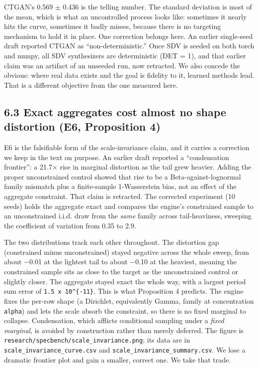 CTGAN's 0.569 \ensuremath{\pm} 0.436 is the telling number. The standard
deviation is most of the mean, which is what an uncontrolled process
looks like: sometimes it nearly hits the curve, sometimes it badly
misses, because there is no targeting mechanism to hold it in place. One
correction belongs here. An earlier single-seed draft reported CTGAN as
``non-deterministic.'' Once SDV is seeded on both torch and numpy, all
SDV synthesizers are deterministic (DET = 1), and that earlier claim was
an artifact of an unseeded run, now retracted. We also concede the
obvious: where real data exists and the goal is fidelity to it, learned
methods lead. That is a different objective from the one measured here.

\hypertarget{exact-aggregates-cost-almost-no-shape-distortion-e6-proposition-4}{%
\subsection{6.3 Exact aggregates cost almost no shape distortion (E6,
Proposition
4)}\label{exact-aggregates-cost-almost-no-shape-distortion-e6-proposition-4}}

E6 is the falsifiable form of the scale-invariance claim, and it carries
a correction we keep in the text on purpose. An earlier draft reported a
``condensation frontier'': a 21.7\ensuremath{\times} rise in marginal
distortion as the tail grew heavier. Adding the proper unconstrained
control showed that rise to be a Beta-against-lognormal family mismatch
plus a finite-sample 1-Wasserstein bias, not an effect of the aggregate
constraint. That claim is retracted. The corrected experiment (10 seeds)
holds the aggregate exact and compares the engine's constrained sample
to an unconstrained i.i.d. draw from the \emph{same} family across
tail-heaviness, sweeping the coefficient of variation from 0.35 to 2.9.

The two distributions track each other throughout. The distortion gap
(constrained minus unconstrained) stayed negative across the whole
sweep, from about \ensuremath{-}0.01 at the lightest tail to about
\ensuremath{-}0.10 at the heaviest, meaning the constrained sample sits
as close to the target as the unconstrained control or slightly closer.
The aggregate stayed exact the whole way, with a largest period sum
error of \texttt{1.5\ x\ 10\^{}\{-11\}}. This is what Proposition 4
predicts. The engine fixes the per-row shape (a Dirichlet, equivalently
Gamma, family at concentration \texttt{alpha}) and lets the scale absorb
the constraint, so there is no fixed marginal to collapse. Condensation,
which afflicts conditional sampling under a \emph{fixed marginal}, is
avoided by construction rather than merely deferred. The figure is
\texttt{research/\allowbreak{}specbench/\allowbreak{}scale\_\allowbreak{}invariance.png}; its data are in
\texttt{scale\_\allowbreak{}invariance\_\allowbreak{}curve.csv} and
\texttt{scale\_\allowbreak{}invariance\_\allowbreak{}summary.csv}. We lose a dramatic frontier
plot and gain a smaller, correct one. We take that trade.

